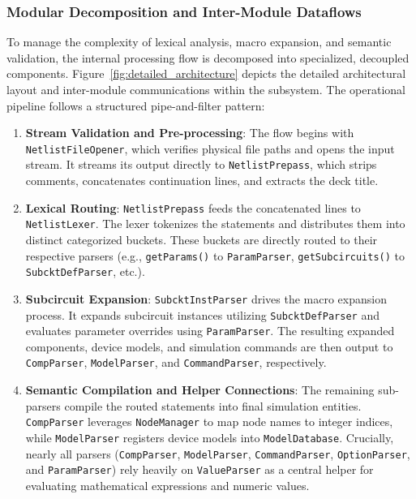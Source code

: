 \subsubsection{Modular Decomposition and Inter-Module Dataflows}

To manage the complexity of lexical analysis, macro expansion, and semantic validation, the internal processing flow is decomposed into specialized, decoupled components. Figure~\ref{fig:detailed_architecture} depicts the detailed architectural layout and inter-module communications within the subsystem. The operational pipeline follows a structured pipe-and-filter pattern:
\begin{enumerate}
    \item \textbf{Stream Validation and Pre-processing}: The flow begins with \texttt{NetlistFileOpener}, which verifies physical file paths and opens the input stream. It streams its output directly to \texttt{NetlistPrepass}, which strips comments, concatenates continuation lines, and extracts the deck title.
    \item \textbf{Lexical Routing}: \texttt{NetlistPrepass} feeds the concatenated lines to \texttt{NetlistLexer}. The lexer tokenizes the statements and distributes them into distinct categorized buckets. These buckets are directly routed to their respective parsers (e.g., \texttt{getParams()} to \texttt{ParamParser}, \texttt{getSubcircuits()} to \texttt{SubcktDefParser}, etc.).
    \item \textbf{Subcircuit Expansion}: \texttt{SubcktInstParser} drives the macro expansion process. It expands subcircuit instances utilizing \texttt{SubcktDefParser} and evaluates parameter overrides using \texttt{ParamParser}. The resulting expanded components, device models, and simulation commands are then output to \texttt{CompParser}, \texttt{ModelParser}, and \texttt{CommandParser}, respectively.
    \item \textbf{Semantic Compilation and Helper Connections}: The remaining sub-parsers compile the routed statements into final simulation entities. \texttt{CompParser} leverages \texttt{NodeManager} to map node names to integer indices, while \texttt{ModelParser} registers device models into \texttt{ModelDatabase}. Crucially, nearly all parsers (\texttt{CompParser}, \texttt{ModelParser}, \texttt{CommandParser}, \texttt{OptionParser}, and \texttt{ParamParser}) rely heavily on \texttt{ValueParser} as a central helper for evaluating mathematical expressions and numeric values.
\end{enumerate}


